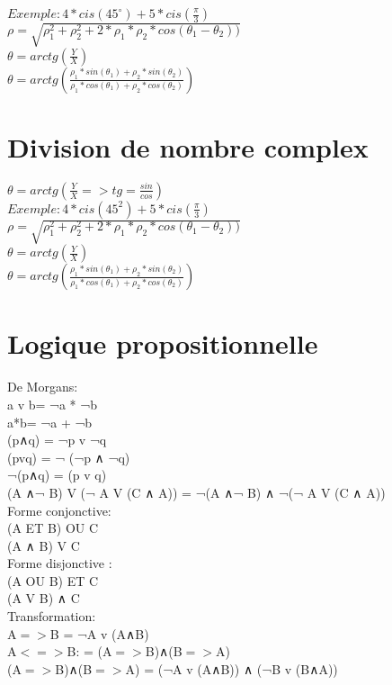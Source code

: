 $ Exemple : 4*cis(45^{\circ}) + 5*cis(\frac{\pi}{3})$\\

$\rho = \sqrt{\rho_1^{2}+\rho_2^{2} + 2 * \rho_1 * \rho_2 * cos(\theta_1-\theta_2))}$ \\

$\theta = arctg(\frac{Y}{X})$\\

$\theta = arctg(\frac{\rho_1 * sin(\theta_1) + \rho_2 * sin(\theta_2)} {\rho_1 * cos(\theta_1) + \rho_2 * cos(\theta_2)})$ \\


\vspace{4mm} %
\section{Division de nombre complex}

$\theta = arctg(\frac{Y}{X} => tg = \frac{sin}{cos} )$ \\

$ Exemple : 4*cis(45^{2}) + 5*cis(\frac{\pi}{3})$\\

$\rho = \sqrt{\rho_1^{2}+\rho_2^{2} + 2 * \rho_1 * \rho_2 * cos(\theta_1-\theta_2))}$ \\

$\theta = arctg(\frac{Y}{X})$\\

$\theta = arctg(\frac{\rho_1 * sin(\theta_1) + \rho_2 * sin(\theta_2)} {\rho_1 * cos(\theta_1) + \rho_2 * cos(\theta_2)})$ \\

\section{Logique propositionnelle}

\vspace{5mm} %
De Morgans: \\
a v b= ¬a * ¬b\\
a*b= ¬a + ¬b\\
(p∧q) = ¬p v ¬q  \\
(pvq) = ¬ (¬p ∧ ¬q)  \\
¬(p∧q) = (p v q)  \\
(A ∧¬ B) V (¬ A V (C ∧ A)) =  ¬(A ∧¬ B) ∧ ¬(¬ A V (C ∧ A))\\

\vspace{5mm} %
Forme conjonctive: \\
(A ET B) OU C \\
(A ∧ B) V C\\

\vspace{5mm} %
Forme disjonctive : \\
(A OU B) ET C \\
(A V B) ∧ C\\

\vspace{5mm} %
Transformation: \\
A$=>$B = ¬A v (A∧B) \\
A$<=>$B: = (A$=>$B)∧(B$=>$A)  \\
(A$=>$B)∧(B$=>$A) = (¬A v (A∧B)) ∧ (¬B v (B∧A))

